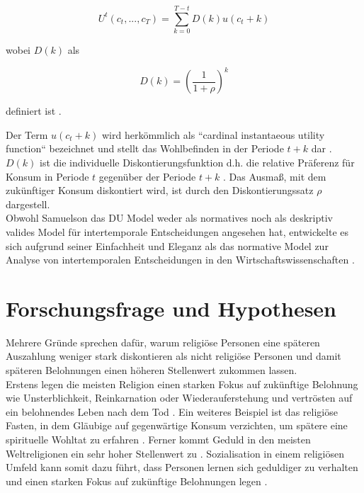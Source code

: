 \documentclass[11pt,a4paper]{article}
\begin{document}
\begin{equation}
U^t(c_t,...,c_T) = \sum^{T - t}_{k=0}D(k)u(c_t+k)
\end{equation}


wobei $D(k)$ als 
 
\begin{equation}
D(k) = (\frac{1}{1+\rho})^k
\end{equation}

definiert ist \parencite{frederick2002time}.\

Der Term $u(c_t+k)$ wird herkömmlich als “cardinal instantaeous utility function“ bezeichnet und stellt das Wohlbefinden in der Periode $t+k$ dar \parencite{frederick2002time}. $D(k)$ ist die individuelle Diskontierungsfunktion d.h. die relative Präferenz für Konsum in Periode $t$ gegenüber der Periode $t+k$ \parencite{frederick2002time}. Das Ausmaß, mit dem zukünftiger Konsum diskontiert wird, ist durch den Diskontierungssatz $\rho$ dargestell\parencite{frederick2002time}.\\

Obwohl Samuelson das DU Model weder als normatives noch als deskriptiv valides Model für intertemporale Entscheidungen angesehen hat, entwickelte es sich aufgrund seiner Einfachheit und Eleganz als das normative Model zur Analyse von intertemporalen Entscheidungen in den Wirtschaftswissenschaften \parencite{frederick2002time}. 

\section{Forschungsfrage und Hypothesen}
Mehrere Gründe sprechen dafür, warum religiöse Personen eine späteren Auszahlung weniger stark diskontieren als nicht religiöse Personen und damit späteren Belohnungen einen höheren Stellenwert zukommen lassen.\\

Erstens legen die meisten Religion einen starken Fokus auf zukünftige Belohnung wie Unsterblichkeit, Reinkarnation oder Wiederauferstehung und vertrösten auf ein belohnendes Leben nach dem Tod \parencite{carter2012religious}. Ein weiteres Beispiel ist das religiöse Fasten, in dem Gläubige auf gegenwärtige Konsum verzichten, um spätere eine spirituelle Wohltat zu erfahren \parencite{thornton2015divine}. Ferner kommt Geduld in den meisten Weltreligionen ein sehr hoher Stellenwert zu \parencite{carter2012religious}. Sozialisation in einem religiösen Umfeld kann somit dazu führt, dass Personen lernen sich geduldiger zu verhalten und einen starken Fokus auf zukünftige Belohnungen legen \parencite{carter2012religious}.\\
\end{document}
